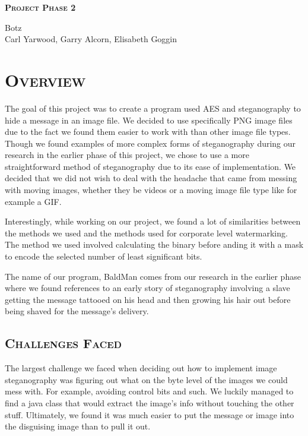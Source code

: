 \documentclass[12pt]{article}
\begin{document}
	\vspace*{2em}
	
	\begin{center}
		{\LARGE {}\selectfont\scshape\textbf{Project Phase 2}}
		
		{\large Botz\\}
		{\footnotesize Carl Yarwood, Garry Alcorn, Elisabeth Goggin}
	\end{center}
	
	\vspace*{2em}
	
	\section[Overview]{\Large{}\selectfont\scshape Overview}
	
	The goal of this project was to create a program used AES and steganography to hide a message in an image file. We decided to use specifically PNG image files due to the fact we found them easier to work with than other image file types. Though we found examples of more complex forms of steganography during our research in the earlier phase of this project, we chose to use a more straightforward method of steganography due to its ease of implementation. We decided that we did not wish to deal with the headache that came from messing with moving images, whether they be videos or a moving image file type like for example a GIF.
	
	Interestingly, while working on our project, we found a lot of similarities between the methods we used and the methods used for corporate level watermarking. The method we used involved calculating the binary before anding it with a mask to encode the selected number of least significant bits.
	
	The name of our program, BaldMan comes from our research in the earlier phase where we found references to an early story of steganography involving a slave getting the message tattooed on his head and then growing his hair out before being shaved for the message's delivery.
	
	\subsection[Challenges Faced]{\hspace*{1em}\large{}\selectfont\scshape Challenges Faced}
	
	The largest challenge we faced when deciding out how to implement image steganography was figuring out what on the byte level of the images we could mess with. For example, avoiding control bits and such. We luckily managed to find a java class that would extract the image's info without touching the other stuff. Ultimately, we found it was much easier to put the message or image into the disguising image than to pull it out.
	
\end{document}

